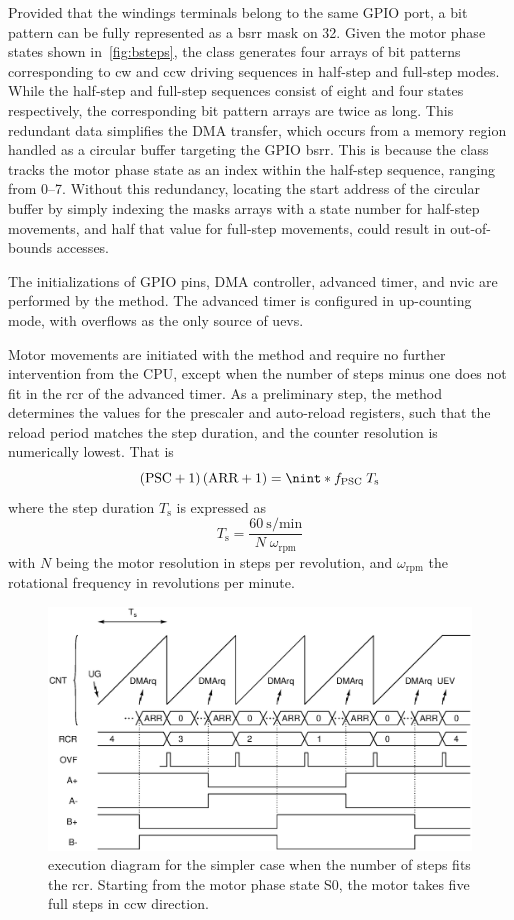 Provided that the windings terminals belong to the same GPIO port, a bit pattern can be fully represented as a \ac{bsrr} mask on \qty{32}{\bit}. Given the motor phase states shown in~\cref{fig:bsteps}, the  class generates four arrays of bit patterns corresponding to \ac{cw} and \ac{ccw} driving sequences in half-step and full-step modes.
While the half-step and full-step sequences consist of eight and four states respectively, the corresponding bit pattern arrays are twice as long. This redundant data simplifies the DMA transfer, which occurs from a memory region handled as a circular buffer targeting the GPIO \ac{bsrr}. This is because the  class tracks the motor phase state as an index within the half-step sequence, ranging from \numrange{0}{7}. Without this redundancy, locating the start address of the circular buffer by simply indexing the masks arrays with a state number for half-step movements, and half that value for full-step movements, could result in out-of-bounds accesses.

The initializations of GPIO pins, DMA controller, advanced timer, and \ac{nvic} are performed by the  method. The advanced timer is configured in up-counting mode, with overflows as the only source of \acp{uev}.

Motor movements are initiated with the  method and require no further intervention from the CPU, except when the number of steps minus one does not fit in the \ac{rcr} of the advanced timer.
As a preliminary step, the  method determines the values for the prescaler and auto-reload registers, such that the reload period matches the step duration, and the counter resolution is numerically lowest. That is
\[
    \pqty*{\text{PSC}+1}\,\pqty*{\text{ARR}+1} = \nint*{{f_\text{PSC}}\;T_\text{s}}
\]
where the step duration $T_\text{s}$ is expressed as
\[
    T_\text{s} = \frac{\qty{60}{\s\per\minute}}{N\;\omega_\text{rpm}}
\]
with $N$ being the motor resolution in steps per revolution, and $\omega_{\text{rpm}}$ the rotational frequency in revolutions per minute.

\begin{figure}
    \centering
    \includegraphics[width=\linewidth]{../gfx/BStepper_run.eps}
    \caption{ execution diagram for the simpler case when the number of steps fits the \acs{rcr}. Starting from the motor phase state S0, the motor takes five full steps in \acs{ccw} direction.}
    \label{fig:bstep_run}
\end{figure}

